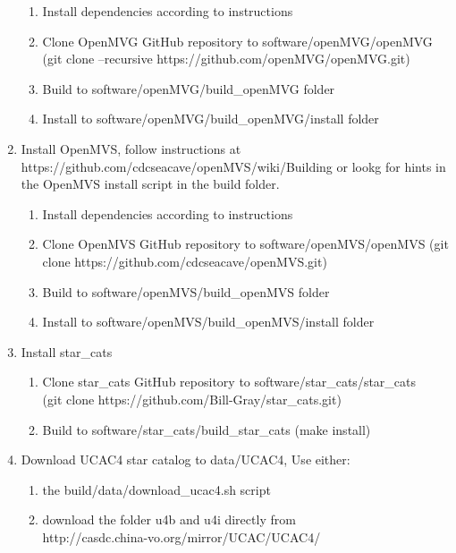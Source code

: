 \begin{enumerate}
    \begin{enumerate}
        \item Install dependencies according to instructions
        \item Clone OpenMVG GitHub repository to software/openMVG/openMVG (git clone --recursive https://github.com/openMVG/openMVG.git)
        \item Build to software/openMVG/build\_openMVG folder
        \item Install to software/openMVG/build\_openMVG/install folder
    \end{enumerate}
    \item Install OpenMVS, follow instructions at \\ https://github.com/cdcseacave/openMVS/wiki/Building or lookg for hints in the OpenMVS install script in the build folder.
    \begin{enumerate}
        \item Install dependencies according to instructions
        \item Clone OpenMVS GitHub repository to software/openMVS/openMVS (git clone https://github.com/cdcseacave/openMVS.git)
        \item Build to software/openMVS/build\_openMVS folder
        \item Install to software/openMVS/build\_openMVS/install folder
    \end{enumerate}
    \item Install star\_cats
    \begin{enumerate}
        \item Clone star\_cats GitHub repository to software/star\_cats/star\_cats \\ (git clone https://github.com/Bill-Gray/star\_cats.git)
        \item Build to software/star\_cats/build\_star\_cats (make install)
    \end{enumerate}
    \item Download UCAC4 star catalog to data/UCAC4, Use either:
    \begin{enumerate}
        \item the build/data/download\_ucac4.sh script
        \item download the folder u4b and u4i directly from \\ http://casdc.china-vo.org/mirror/UCAC/UCAC4/
    \end{enumerate}
\end{enumerate}{}

